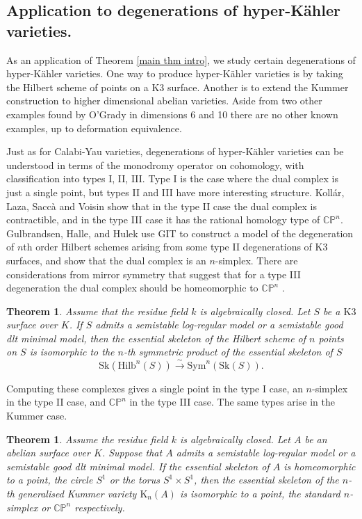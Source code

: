 \documentclass{amsart}%
\numberwithin{equation}{subsection}
\theoremstyle{plain2}
\newtheorem{theorem}[equation]{Theorem}
\theoremstyle{definition2}
\theoremstyle{stepstyle}
\theoremstyle{point}
\theoremstyle{subpoint}
\newcommand{\CP}{\ensuremath{\mathbb{CP}}}
\newcommand{\Hilb}{\ensuremath{\mathrm{Hilb}}}
\newcommand{\Sym}{\mathrm{Sym}}
\newcommand{\Sk}{\mathrm{Sk}}
\begin{document}
\subsection{Application to degenerations of hyper-K{\"a}hler varieties.}

As an application of Theorem \ref{main thm intro}, we study certain degenerations of hyper-K{\"a}hler varieties. One way to produce hyper-K{\"a}hler varieties is by taking the Hilbert scheme of points on a K3 surface. Another is to extend the Kummer construction to higher dimensional abelian varieties. Aside from two other examples found by O'Grady in dimensions 6 \cite{OGrady} and 10 \cite{OGradya} there are no other known examples, up to deformation equivalence.

Just as for Calabi-Yau varieties, degenerations of hyper-K{\"a}hler varieties can be understood in terms of the monodromy operator on cohomology, with classification into types I, II, III. Type I is the case where the dual complex is just a single point, but types II and III have more interesting structure. Koll{\'a}r, Laza, Sacc{\`a} and Voisin \cite{KollarLazaSaccaEtAl2017} show that in the type II case the dual complex is contractible, and in the type III case it has the rational homology type of $\mathbb{C}\mathbb{P}^n$. Gulbrandsen, Halle, and Hulek  \cite{GulbrandsenHalleHulek} use GIT to construct a model of the degeneration of $n$th order Hilbert schemes arising from some type II degenerations of K3 surfaces, and show that the dual complex is an $n$-simplex. There are considerations from mirror symmetry that suggest that for a type III degeneration the dual complex should be homeomorphic to $\mathbb{C}\mathbb{P}^n$ \cite{Hwang, KontsevichSoibelman}.

\begin{theorem}
Assume that the residue field $k$ is algebraically closed. Let $S$ be a $\text{K}3$ surface over $K$. If $S$ admits a semistable log-regular model or a semistable good dlt minimal model, then the essential skeleton of the Hilbert scheme of $n$ points on $S$ is isomorphic to the $n$-th symmetric product of the essential skeleton of $S$ $$\Sk(\Hilb^n(S)) \xrightarrow{\sim} \Sym^n(\Sk(S)).$$ 
\end{theorem}

Computing these complexes gives a single point in the type I case, an $n$-simplex in the type II case, and $\mathbb{C}\mathbb{P}^n$ in the type III case. The same types arise in the Kummer case.

\begin{theorem}
Assume the residue field $k$ is algebraically closed. Let $A$ be an abelian surface over $K$. Suppose that $A$ admits a semistable log-regular model or a semistable good dlt minimal model. If the essential skeleton of $A$ is homeomorphic to a point, the circle $S^1$ or the torus $S^1 \times S^1$, then the essential skeleton of the $n$-th generalised Kummer variety $\text{K}_n(A)$ is isomorphic to a point, the standard $n$-simplex or $\CP^n$ respectively. 
\end{theorem}
\end{document}
